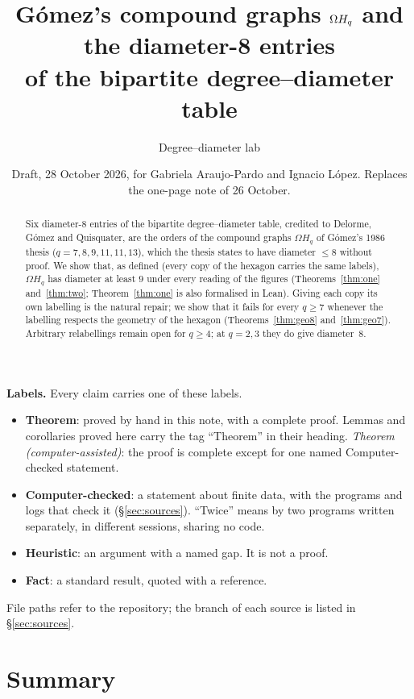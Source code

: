 \documentclass[11pt]{amsart}
\title[Gómez's $\Om H_q$ and the diameter-8 entries]{Gómez's compound graphs $\Om H_q$ and the diameter-8 entries\\ of the bipartite degree--diameter table}
\author{Degree--diameter lab}
\date{Draft, 28 October 2026, for Gabriela Araujo-Pardo and Ignacio López. Replaces the one-page note of 26 October.}
\theoremstyle{plain}
\theoremstyle{definition}
\theoremstyle{remark}
\newcommand{\Om}{\Omega}
\begin{document}
\begin{abstract}
Six diameter-8 entries of the bipartite degree--diameter table, credited to Delorme, Gómez and Quisquater, are the orders of
the compound graphs $\Om H_q$ of Gómez's 1986 thesis ($q = 7, 8, 9, 11, 11, 13$), which the thesis states to have diameter
$\le 8$ without proof. We show that, as defined (every copy of the hexagon carries the same labels), $\Om H_q$ has
diameter at least $9$ under every reading of the figures (Theorems~\ref{thm:one} and~\ref{thm:two}; Theorem~\ref{thm:one}
is also formalised in Lean). Giving each copy its own labelling is the natural repair; we show that it fails for every
$q \ge 7$ whenever the labelling respects the geometry of the hexagon (Theorems~\ref{thm:geo8} and~\ref{thm:geo7}).
Arbitrary relabellings remain open for $q \ge 4$; at $q = 2, 3$ they do give diameter~$8$.
\end{abstract}

\maketitle

\noindent\textbf{Labels.} Every claim carries one of these labels.
\begin{itemize}[leftmargin=1.5em]
\item \textbf{Theorem}: proved by hand in this note, with a complete proof. Lemmas and corollaries proved here carry the tag
  ``Theorem'' in their heading. \emph{Theorem (computer-assisted)}: the proof is complete except for one named
  Computer-checked statement.
\item \textbf{Computer-checked}: a statement about finite data, with the programs and logs that check it (\S\ref{sec:sources}).
  ``Twice'' means by two programs written separately, in different sessions, sharing no code.
\item \textbf{Heuristic}: an argument with a named gap. It is not a proof.
\item \textbf{Fact}: a standard result, quoted with a reference.
\end{itemize}
File paths refer to the repository; the branch of each source is listed in \S\ref{sec:sources}.

\section*{Summary}\label{sec:summary}
\end{document}
